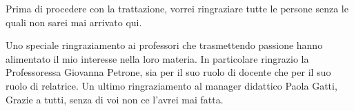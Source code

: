 \thispagestyle{plain}
Prima di procedere con la trattazione, vorrei ringraziare tutte le persone senza le quali non sarei mai arrivato qui.


Uno speciale ringraziamento ai professori che trasmettendo passione hanno alimentato il mio interesse nella loro materia.
In particolare ringrazio la Professoressa Giovanna Petrone, sia per il suo ruolo di docente che per il suo ruolo di relatrice. 
Un ultimo ringraziamento al manager didattico Paola Gatti, 
Grazie a tutti, senza di voi non ce l’avrei mai fatta.